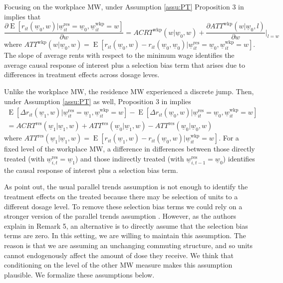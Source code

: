 \documentclass{article}
\newcommand{\mw}{\underline{w}}
\newcommand{\wkp}{\text{wkp}}
\newcommand{\res}{\text{res}}
\DeclareMathOperator{\E}{E}
\begin{document}
Focusing on the workplace MW, under Assumption \ref{assu:PT}
Proposition 3 in \textcite{CallawayEtAl2021} implies that
$$
\frac{\partial \E\left[r_{it}(\mw_0, w) | \mw_{it}^{\res} = \mw_0, \mw_{it}^{\wkp} = w\right]}
     {\partial w} 
    = ACRT^{\wkp}(w | \mw_0, w) + \frac{\partial ATT^{\wkp}(w | \mw_0, l)}{\partial w} \Big|_{l = w}
$$
where $ATT^{\wkp}(w | \mw_0, w) = \E\left[r_{it}(\mw_0, w) - r_{it}(\mw_0, \mw_0) \big| \mw_{it}^{\res} = \mw_0, \mw_{it}^{\wkp} = w\right]$.
The slope of average rents with respect to the minimum wage identifies
the average causal response of interest plus a selection bias term that arises
due to differences in treatment effects across dosage leves.

Unlike the workplace MW, the residence MW experienced a discrete jump.
Then, under Assumption \ref{assu:PT} as well, 
Proposition 3 in \textcite{CallawayEtAl2021} implies
\begin{equation*}
\begin{split}
\E\left[\Delta r_{it}(\mw_1, w) | \mw_{it}^{\res} = \mw_1, \mw_{it}^{\wkp} = w\right] - \E\left[\Delta r_{it}(\mw_0, w) | \mw_{it}^{\res} = \mw_0, \mw_{it}^{\wkp} = w\right] \\
 = ACRT^{\res}(\mw_1 | \mw_1, w) + ATT^{\res}(\mw_0 | \mw_1, w) - ATT^{\res}(\mw_0 | \mw_0, w)
\end{split}
\end{equation*}
where $ATT^{\res}(\mw_1 | \mw_1, w) = \E\left[r_{it}(\mw_1, w) - r_{it}(\mw_0, w) \big| \mw_{it}^{\wkp} = w\right]$.
For a fixed level of the workplace MW, a difference in differences between
those directly treated (with $\mw^{\res}_{i,t}=\mw_1$) and
those indirectly treated (with $\mw^{\res}_{i,t-1}=\mw_0$) identifies
the causal response of interest plus a selection bias term.

As \textcite{CallawayEtAl2021} point out, the usual parallel trends assumption 
is not enough to identify the treatment effects on the treated because there may 
be selection of units to a different dosage level.
To remove these selection bias terms we could rely on a stronger version of
the parallel trends assumption 
\parencite[see Assumption 5 in][]{CallawayEtAl2021}.
However, as the authors explain in Remark 5, an alternative is to directly
assume that the selection bias terms are zero.
In this setting, we are willing to maintain this assumption.
The reason is that we are assuming an unchanging commuting structure, and
so units cannot endogenously affect the amount of dose they receive.
We think that conditioning on the level of the other MW measure makes this
assumption plausible.
We formalize these assumptions below.
\end{document}
